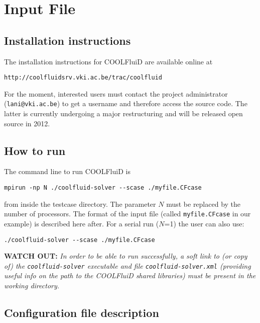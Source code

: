 \documentclass[11pt]{article}
\begin{document}
\section{Input File}

\subsection{Installation instructions}

The installation instructions for COOLFluiD are available online at

\begin{lstlisting}[breaklines]
http://coolfluidsrv.vki.ac.be/trac/coolfluid
\end{lstlisting}

For the moment, interested users must contact the project administrator ({\tt lani@vki.ac.be}) to 
get a username and therefore access the source code. The latter is currently undergoing a major 
restructuring and will be released open source in 2012.

\subsection{How to run}

The command line to run COOLFluiD is 

\begin{lstlisting}[breaklines]
mpirun -np N ./coolfluid-solver --scase ./myfile.CFcase
\end{lstlisting}
from inside the testcase directory. The parameter $N$ must be replaced by the number of 
processors. The format of the input file (called {\tt myfile.CFcase} in our example) is described here after.
For a serial run ($N$=1) the user can also use:

\begin{lstlisting}[breaklines]
./coolfluid-solver --scase ./myfile.CFcase
\end{lstlisting}

{\bf WATCH OUT:} {\it In order to be able to run successfully, a soft link to (or copy of) the {\tt coolfluid-solver} executable and file {\tt coolfluid-solver.xml} (providing useful info on the path to the COOLFluiD shared libraries) must be present in the working directory.}

\subsection{Configuration file description}
\end{document}
